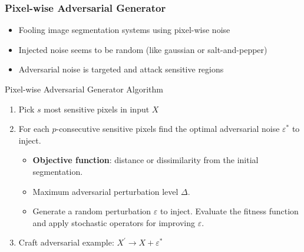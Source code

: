 \documentclass{beamer}
\begin{document}
\begin{frame}
	\frametitle{Pixel-wise Adversarial Generator}
	\begin{itemize}
		\item Fooling image segmentation systems using pixel-wise noise
		\item Injected noise seems to be random (like gaussian or salt-and-pepper)
		\item Adversarial noise is targeted and attack sensitive regions
	\end{itemize}
	\begin{block}{Pixel-wise Adversarial Generator Algorithm}
		
		\begin{enumerate}
			\item Pick $s$ most sensitive pixels in input $X$
			\item For each $p$-consecutive sensitive pixels find the optimal adversarial noise $\varepsilon^*$ to inject.
			\begin{itemize}
				\item \textbf{Objective function}: distance or dissimilarity from the initial segmentation. 
				
				\item Maximum adversarial perturbation level $\Delta$.
				
				\item Generate a random perturbation $\varepsilon$ to inject. Evaluate the fitness function and apply stochastic operators for improving $\varepsilon$.
			\end{itemize}
			\item Craft adversarial example: $X^\prime\rightarrow X + \varepsilon^*$
		\end{enumerate}
		
	\end{block}
\end{frame}
\end{document}
